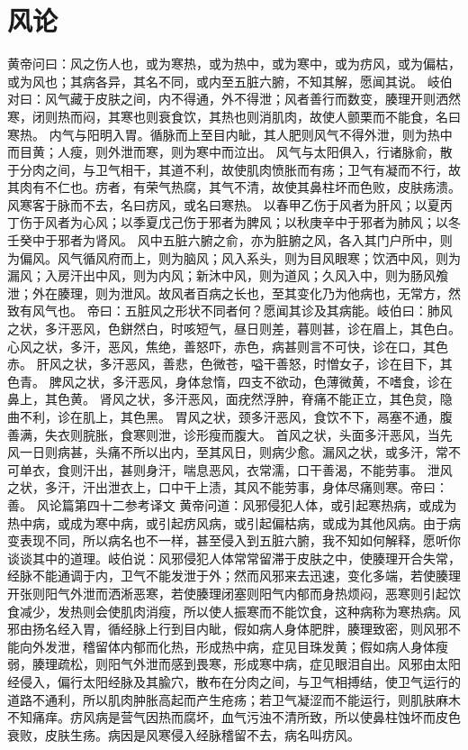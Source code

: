 \documentclass[a4paper,12pt,UTF8,twoside]{ctexbook}
\begin{document}
\chapter{风论}
黄帝问曰：风之伤人也，或为寒热，或为热中，或为寒中，或为疠风，或为偏枯，或为风也；其病各异，其名不同，或内至五脏六腑，不知其解，愿闻其说。
岐伯对曰：风气藏于皮肤之间，内不得通，外不得泄；风者善行而数变，腠理开则洒然寒，闭则热而闷，其寒也则衰食饮，其热也则消肌肉，故使人颤栗而不能食，名曰寒热。
内气与阳明入胃。循脉而上至目内眦，其人肥则风气不得外泄，则为热中而目黄；人瘦，则外泄而寒，则为寒中而泣出。
风气与太阳俱入，行诸脉俞，散于分肉之间，与卫气相干，其道不利，故使肌肉愤胀而有疡；卫气有凝而不行，故其肉有不仁也。疠者，有荣气热腐，其气不清，故使其鼻柱坏而色败，皮肤疡溃。风寒客于脉而不去，名曰疠风，或名曰寒热。
以春甲乙伤于风者为肝风；以夏丙丁伤于风者为心风；以季夏戊己伤于邪者为脾风；以秋庚辛中于邪者为肺风；以冬壬癸中于邪者为肾风。
风中五脏六腑之俞，亦为脏腑之风，各入其门户所中，则为偏风。风气循风府而上，则为脑风；风入系头，则为目风眼寒；饮洒中风，则为漏风；入房汗出中风，则为内风；新沐中风，则为道风；久风入中，则为肠风飧泄；外在腠理，则为泄风。故风者百病之长也，至其变化乃为他病也，无常方，然致有风气也。
帝曰：五脏风之形状不同者何？愿闻其诊及其病能。岐伯曰：肺风之状，多汗恶风，色鉼然白，时咳短气，昼日则差，暮则甚，诊在眉上，其色白。心风之状，多汗，恶风，焦绝，善怒吓，赤色，病甚则言不可快，诊在口，其色赤。
肝风之状，多汗恶风，善悲，色微苍，嗌干善怒，时憎女子，诊在目下，其色青。
脾风之状，多汗恶风，身体怠惰，四支不欲动，色薄微黄，不嗜食，诊在鼻上，其色黄。
肾风之状，多汗恶风，面疣然浮肿，脊痛不能正立，其色炱，隐曲不利，诊在肌上，其色黑。
胃风之状，颈多汗恶风，食饮不下，鬲塞不通，腹善满，失衣则脘胀，食寒则泄，诊形瘦而腹大。
首风之状，头面多汗恶风，当先风一日则病甚，头痛不所以出内，至其风日，则病少愈。漏风之状，或多汗，常不可单衣，食则汗出，甚则身汗，喘息恶风，衣常濡，口干善渴，不能劳事。
泄风之状，多汗，汗出泄衣上，口中干上渍，其风不能劳事，身体尽痛则寒。帝曰：善。
风论篇第四十二参考译文
黄帝问道：风邪侵犯人体，或引起寒热病，或成为热中病，或成为寒中病，或引起疠风病，或引起偏枯病，或成为其他风病。由于病变表现不同，所以病名也不一样，甚至侵入到五脏六腑，我不知如何解释，愿听你谈谈其中的道理。岐伯说：风邪侵犯人体常常留滞于皮肤之中，使腠理开合失常，经脉不能通调于内，卫气不能发泄于外；然而风邪来去迅速，变化多端，若使腠理开张则阳气外泄而洒淅恶寒，若使腠理闭塞则阳气内郁而身热烦闷，恶寒则引起饮食减少，发热则会使肌肉消瘦，所以使人振寒而不能饮食，这种病称为寒热病。风邪由扬名经入胃，循经脉上行到目内眦，假如病人身体肥胖，腠理致密，则风邪不能向外发泄，稽留体内郁而化热，形成热中病，症见目珠发黄；假如病人身体瘦弱，腠理疏松，则阳气外泄而感到畏寒，形成寒中病，症见眼泪自出。风邪由太阳经侵入，偏行太阳经脉及其腧穴，散布在分肉之间，与卫气相搏结，使卫气运行的道路不通利，所以肌肉肿胀高起而产生疮疡；若卫气凝涩而不能运行，则肌肤麻木不知痛痒。疠风病是营气因热而腐坏，血气污浊不清所致，所以使鼻柱蚀坏而皮色衰败，皮肤生疡。病因是风寒侵入经脉稽留不去，病名叫疠风。
\end{document}
